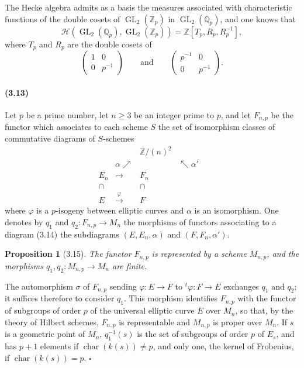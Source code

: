 \documentclass[10pt]{article}
\newcommand{\Q}{\mathbb Q}
\newcommand{\Z}{\mathbb Z}
\newcommand{\GL}{\operatorname{GL}}
\newcommand{\cH}{\mathcal H}
\newcommand{\QED}{\hfill$\square$}
\newcommand{\charop}{\operatorname{char}}
\newtheorem*{proposition}{Proposition}
\begin{document}
The Hecke algebra admits as a basis the measures associated with characteristic functions
of the double cosets of $\GL_2(\Z_p)$ in $\GL_2(\Q_p)$, and one knows that
\[
\cH(\GL_2(\Q_p),\GL_2(\Z_p))=\Z[T_p,R_p,R_p^{-1}],
\]
where $T_p$ and $R_p$ are the double cosets of
\[
\begin{pmatrix}1&0\\0&p^{-1}\end{pmatrix}
\qquad\text{and}\qquad
\begin{pmatrix}p^{-1}&0\\0&p^{-1}\end{pmatrix}.
\]


\paragraph{(3.13)}
Let $p$ be a prime number, let $n\geq 3$ be an integer prime to $p$, and let $F_{n,p}$ be the functor which associates to each scheme $S$ the set of isomorphism classes of commutative diagrams of $S$-schemes
\[
\begin{array}{ccccc}
&& \Z/(n)^2 &&\\[-0.2em]
& \alpha\nearrow && \nwarrow\alpha' &\\[-0.2em]
E_n & \longrightarrow & F_n &&\\[-0.2em]
\cap && \cap &&\\[-0.2em]
E & \xrightarrow{\ \varphi\ } & F &&
\end{array}
\tag{3.14}
\]
where $\varphi$ is a $p$-isogeny between elliptic curves and $\alpha$ is an isomorphism. One denotes by $q_1$ and $q_2:F_{n,p}\to M_n$ the morphisms of functors associating to a diagram (3.14) the subdiagrams $(E,E_n,\alpha)$ and $(F,F_n,\alpha')$.

\begin{proposition}[3.15]
The functor $F_{n,p}$ is represented by a scheme $M_{n,p}$, and the morphisms $q_1,q_2:M_{n,p}\to M_n$ are finite.
\end{proposition}

The automorphism $\sigma$ of $F_{n,p}$ sending $\varphi:E\to F$ to ${}^{t}\!\varphi:F\to E$ exchanges $q_1$ and $q_2$; it suffices therefore to consider $q_1$. This morphism identifies $F_{n,p}$ with the functor of subgroups of order $p$ of the universal elliptic curve $E$ over $M_n$, so that, by the theory of Hilbert schemes, $F_{n,p}$ is representable and $M_{n,p}$ is proper over $M_n$. If $s$ is a geometric point of $M_n$, $q_1^{-1}(s)$ is the set of subgroups of order $p$ of $E_s$, and has $p+1$ elements if $\charop(k(s))\ne p$, and only one, the kernel of Frobenius, if $\charop(k(s))=p$. \QED
\end{document}

